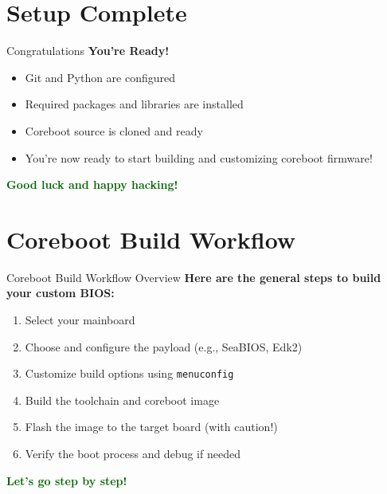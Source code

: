 \documentclass{beamer}
\begin{document}
	
	
	\section{Setup Complete}
	\begin{frame}{Congratulations}
		\textbf{You're Ready!}
			
		\begin{itemize}
			\item Git and Python are configured
			\item Required packages and libraries are installed
			\item Coreboot source is cloned and ready
			\item You're now ready to start building and customizing coreboot firmware!
		\end{itemize}
		
		\vspace{0.6cm}
		\centering
		\textbf{\huge \textcolor{darkgreen}{Good luck and happy hacking!}}
	\end{frame}
	
	
	
	
	
	\section{Coreboot Build Workflow}
	\begin{frame}{Coreboot Build Workflow Overview}
		\textbf{Here are the general steps to build your custom BIOS:}
		
		\begin{enumerate}
			\item Select your mainboard
			\item Choose and configure the payload (e.g., SeaBIOS, Edk2)
			\item Customize build options using \texttt{menuconfig}
			\item Build the toolchain and coreboot image
			\item Flash the image to the target board (with caution!)
			\item Verify the boot process and debug if needed
		\end{enumerate}
		
		\vspace{0.4cm}
		\centering
		\textbf{\huge \textcolor{darkgreen}{Let’s go step by step!}}
	\end{frame}
	
	
	
\end{document}
